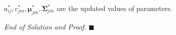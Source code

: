 \documentclass{article}
\renewcommand{\qedsymbol}{\hfill $\blacksquare$\par}
\begin{document}
\begin{itemize}
\begin{itemize}
            $a_{ij}^*,c_{jm}^*,\boldsymbol{\mu}_{jm}^*,\boldsymbol{\Sigma}_{jm}^*$ are the updated values of parameters.
             
         \end{itemize}
     \end{itemize}
         
\vspace{3em}
\hspace{29.5em}
\textit{End of Solution and Proof.} \qedsymbol
\end{document}
